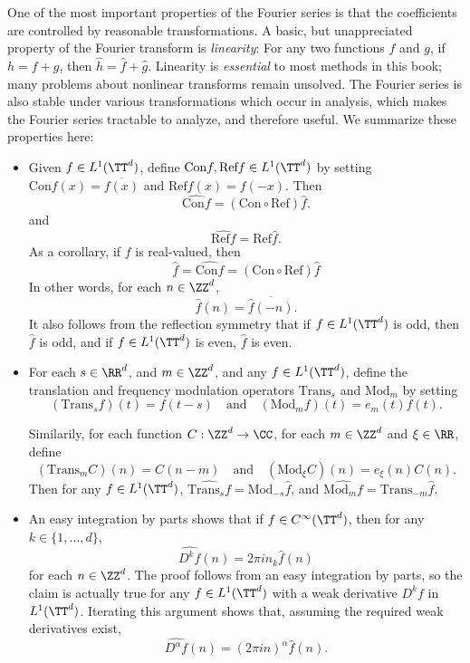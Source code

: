 One of the most important properties of the Fourier series is that the coefficients are controlled by reasonable transformations. A basic, but unappreciated property of the Fourier transform is \emph{linearity}: For any two functions $f$ and $g$, if $h = f + g$, then $\widehat{h} = \widehat{f} + \widehat{g}$. Linearity is \emph{essential} to most methods in this book; many problems about nonlinear transforms remain unsolved. The Fourier series is also stable under various transformations which occur in analysis, which makes the Fourier series tractable to analyze, and therefore useful. We summarize these properties here:
%
\begin{itemize}
    \item Given $f \in L^1(\TT^d)$, define $\text{Con} f, \text{Ref} f \in L^1(\TT^d)$ by setting $\text{Con} f(x) = \overline{f(x)}$ and $\text{Ref} f(x) = f(-x)$. Then
    \[ \widehat{\text{Con} f} = (\text{Con} \circ \text{Ref}) \widehat{f}. \]
    and
    \[ \widehat{\text{Ref} f} = \text{Ref} \widehat{f}. \]
    As a corollary, if $f$ is real-valued, then
    \[ \widehat{f} = \widehat{\text{Con} f} = (\text{Con} \circ \text{Ref}) \widehat{f} \]
    In other words, for each $n \in \ZZ^d$,
    \[ \widehat{f}(n) = \overline{\widehat{f}(-n)}. \]
    It also follows from the reflection symmetry that if $f \in L^1(\TT^d)$ is odd, then $\widehat{f}$ is odd, and if $f \in L^1(\TT^d)$ is even, $\widehat{f}$ is even.

    \item For each $s \in \RR^d$, and $m \in \ZZ^d$, and any $f \in L^1(\TT^d)$, define the translation and frequency modulation operators $\text{Trans}_s$ and $\text{Mod}_m$ by setting
    \[ (\text{Trans}_s f)(t) = f(t - s) \quad\text{and}\quad (\text{Mod}_m f)(t) = e_m(t) f(t). \]

    Similarily, for each function $C: \ZZ^d \to \CC$, for each $m \in \ZZ^d$ and $\xi \in \RR$, define
    \[ (\text{Trans}_m C)(n) = C(n - m) \quad\text{and}\quad (\text{Mod}_\xi C)(n) = e_\xi(n) C(n). \]
    Then for any $f \in L^1(\TT^d)$, $\widehat{\text{Trans}_s f} = \text{Mod}_{-s} \widehat{f}$, and $\widehat{\text{Mod}_m f} = \text{Trans}_{-m} \widehat{f}$.

    \item An easy integration by parts shows that if $f \in C^\infty(\TT^d)$, then for any $k \in \{ 1, \dots, d \}$,
    \[ \widehat{D^k f}(n) = 2 \pi i n_k \widehat{f}(n) \]
    for each $n \in \ZZ^d$. The proof follows from an easy integration by parts, so the claim is actually true for any $f \in L^1(\TT^d)$ with a weak derivative $D^k f$ in $L^1(\TT^d)$. Iterating this argument shows that, assuming the required weak derivatives exist,
    \[ \widehat{D^\alpha f}(n) = (2 \pi i n)^\alpha \widehat{f}(n). \]
\end{itemize}

